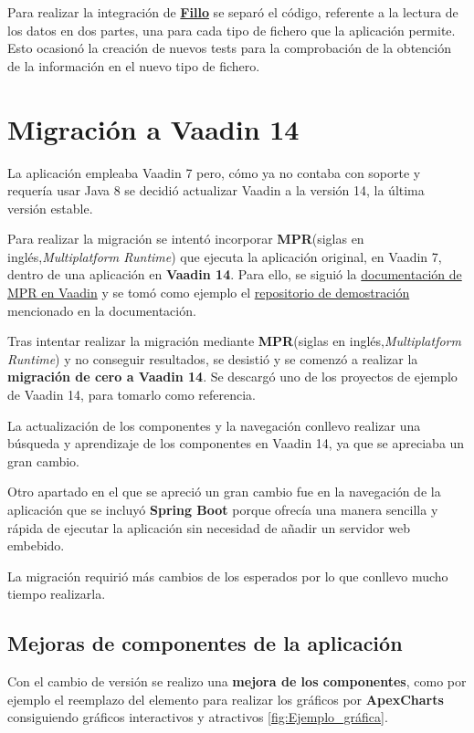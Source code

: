 Para realizar la integración de \textbf{\href{https://codoid.com/fillo/}{Fillo}} se separó el código, referente a la lectura de los datos en dos partes, una para cada tipo de fichero que la aplicación permite. Esto ocasionó la creación de nuevos tests para la comprobación de la obtención de la información en el nuevo tipo de fichero.

\section{Migración a Vaadin 14}
La aplicación empleaba Vaadin 7 pero, cómo ya no contaba con soporte y requería usar Java 8 se decidió actualizar Vaadin a la versión 14, la última versión estable.  

Para realizar la migración se intentó incorporar \textbf{MPR}(siglas en inglés,\emph{Multiplatform Runtime}) que ejecuta la aplicación original, en Vaadin 7, dentro de una aplicación en \textbf{Vaadin 14}. Para ello, se siguió la \href{https://vaadin.com/docs/v14/tools/mpr/introduction/step-1-maven-v7}{documentación de MPR en Vaadin} y se tomó como ejemplo el \href{https://github.com/OlliTietavainenVaadin/mpr-demo/tree/v7}{repositorio de demostración} mencionado en la documentación.

Tras intentar realizar la migración mediante \textbf{MPR}(siglas en inglés,\emph{Multiplatform Runtime}) y no conseguir resultados, se desistió y se comenzó a realizar la \textbf{migración de cero a Vaadin 14}. Se descargó uno de los proyectos de ejemplo de Vaadin 14, para tomarlo como referencia. 

La actualización de los componentes y la navegación conllevo realizar una búsqueda y aprendizaje de los componentes en Vaadin 14, ya que se apreciaba un gran cambio.

Otro apartado en el que se apreció un gran cambio fue en la navegación de la aplicación que se incluyó \textbf{Spring Boot} porque ofrecía una manera sencilla y rápida de ejecutar la aplicación sin necesidad de añadir un servidor web embebido.

La migración requirió más cambios de los esperados por lo que conllevo mucho tiempo realizarla.

\subsection{Mejoras de componentes de la aplicación}
Con el cambio de versión se realizo una \textbf{mejora de los componentes}, como por ejemplo el reemplazo del elemento para realizar los gráficos por \textbf{ApexCharts} consiguiendo gráficos interactivos y atractivos \ref{fig:Ejemplo_gráfica}.

